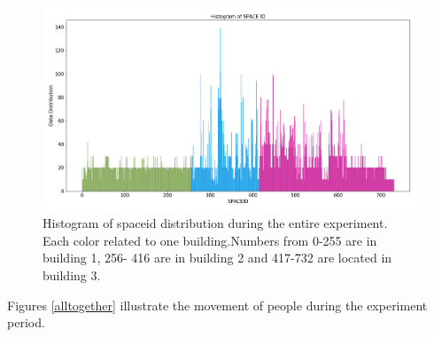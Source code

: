 \documentclass[../UNBThesis2.tex]{subfiles}
\begin{document}
\begin{figure}
    \centering
    \includegraphics[width = 16 cm]{image/Chapters/Chapter6/uniqspaceid.png}
    \caption{Histogram of spaceid distribution during the entire experiment. Each color related to one building.Numbers from 0-255 are in building 1, 256- 416 are in building 2 and 417-732 are located in building 3.}
    \label{spaceiduniq }
\end{figure}






Figures \ref{alltogether} illustrate the movement of people during the experiment period. 
\end{document}
